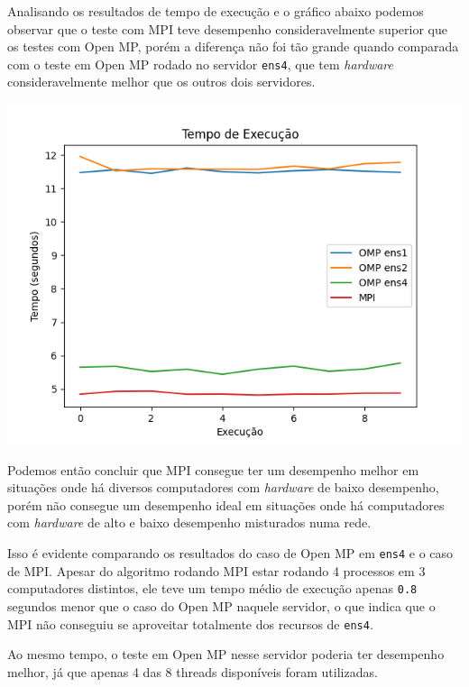 \documentclass[10pt,a4paper]{article}
\begin{document}
		Analisando os resultados de tempo de execução e o gráfico abaixo podemos observar que o teste com MPI
		teve desempenho consideravelmente superior que os testes com Open MP, porém a diferença não foi tão
		grande quando comparada com o teste em Open MP rodado no servidor \texttt{ens4}, que tem \textit{hardware}
		consideravelmente melhor que os outros dois servidores.
		
		\includegraphics[scale=.7]{Tempo.png}
		
		Podemos então concluir que MPI consegue ter um desempenho melhor em situações onde há diversos computadores
		com \textit{hardware} de baixo desempenho, porém não consegue um desempenho ideal em situações onde há
		computadores com \textit{hardware} de alto e baixo desempenho misturados numa rede. 
		
		Isso é evidente comparando os resultados do caso de Open MP em \texttt{ens4} e o caso de MPI. Apesar do algoritmo
		rodando MPI estar rodando 4 processos em 3 computadores distintos, ele teve um tempo médio de execução apenas
		\texttt{0.8} segundos menor que o caso do Open MP naquele servidor, o que indica que o MPI não conseguiu se aproveitar
		totalmente dos recursos de \texttt{ens4}.

		Ao mesmo tempo, o teste em Open MP nesse servidor poderia ter desempenho melhor, já que apenas 4 das 8 threads disponíveis
		foram utilizadas. 
\end{document}
